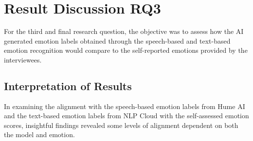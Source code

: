 
\section{Result Discussion RQ3}
For the third and final research question, the objective was to assess how the AI generated emotion labels obtained through the speech-based and text-based emotion recognition would compare to the self-reported emotions provided by the interviewees.

\subsection{Interpretation of Results}
In examining the alignment with the speech-based emotion labels from Hume AI and the text-based emotion labels from NLP Cloud with the self-assessed emotion scores, insightful findings revealed some levels of alignment dependent on both the model and emotion.

